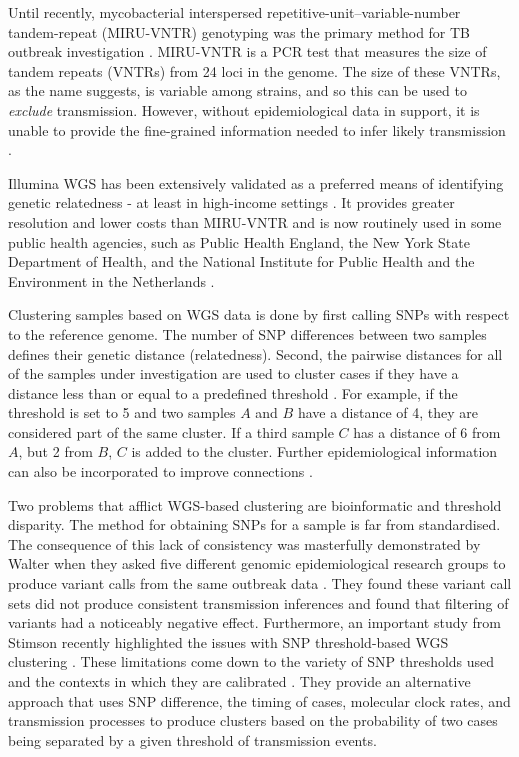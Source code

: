 Until recently, mycobacterial interspersed repetitive-unit–variable-number tandem-repeat (MIRU-VNTR) genotyping was the primary method for TB outbreak investigation \cite{walker2013}. MIRU-VNTR is a PCR test that measures the size of tandem repeats (VNTRs) from 24 loci in the \mtb{} genome. The size of these VNTRs, as the name suggests, is variable among strains, and so this can be used to \emph{exclude} transmission. However, without epidemiological data in support, it is unable to provide the fine-grained information needed to infer likely transmission \cite{walker2013,Wyllie2018}.

Illumina WGS has been extensively validated as a preferred means of identifying \mtb{} genetic relatedness - at least in high-income settings \cite{Gardy2011,walker2013,Wyllie2018,tbmask2014,Hatherell2016}. It provides greater resolution and lower costs than MIRU-VNTR and is now routinely used in some public health agencies, such as Public Health England, the New York State Department of Health, and the National Institute for Public Health and the Environment in the Netherlands \cite{Wyllie2018,smith2020,Jajou2018}. 

Clustering samples based on WGS data is done by first calling SNPs with respect to the \mtb{} reference genome. The number of SNP differences between two samples defines their genetic distance (relatedness). Second, the pairwise distances for all of the samples under investigation are used to cluster cases if they have a distance less than or equal to a predefined threshold \cite{Gardy2011,walker2013}. For example, if the threshold is set to 5 and two samples $A$ and $B$ have a distance of 4, they are considered part of the same cluster. If a third sample $C$ has a distance of 6 from $A$, but 2 from $B$, $C$ is added to the cluster. Further epidemiological information can also be incorporated to improve connections \cite{Gardy2011,stimson2019}.

Two problems that afflict WGS-based clustering are bioinformatic and threshold disparity. The method for obtaining SNPs for a sample is far from standardised. The consequence of this lack of consistency was masterfully demonstrated by Walter \etal{} when they asked five different genomic epidemiological research groups to produce variant calls from the same outbreak data \cite{walter2020}. They found these variant call sets did not produce consistent transmission inferences and found that filtering of variants had a noticeably negative effect. Furthermore, an important study from Stimson \etal{} recently highlighted the issues with SNP threshold-based WGS clustering \cite{stimson2019}. These limitations come down to the variety of SNP thresholds used and the contexts in which they are calibrated \cite{stimson2019}. They provide an alternative approach that uses SNP difference, the timing of cases, molecular clock rates, and transmission processes to produce clusters based on the probability of two cases being separated by a given threshold of transmission events.

